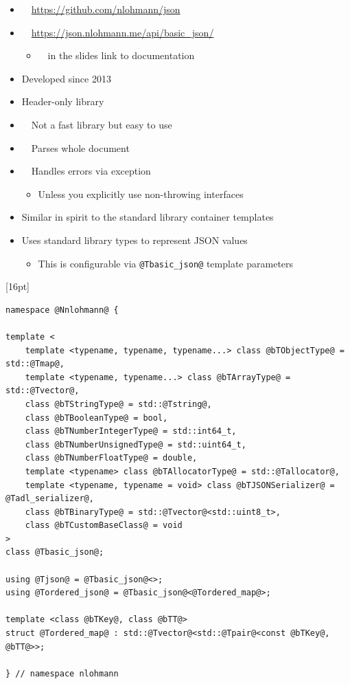 \documentclass{slides}
\makeatletter
\newcommand{\@slidetitle}{}
\newcommand{\slidetitle}[1]{\renewcommand{\@slidetitle}{#1}}
\makeatother
\begin{document}
\begin{itemize}[itemsep=0.5em]
  \item \faGithub\ \ \url{https://github.com/nlohmann/json}
  \item \faFileTextO\ \ \url{https://json.nlohmann.me/api/basic_json/}
  \begin{itemize}
    \item \faFileTextO\ \ in the slides link to documentation
  \end{itemize}
  \item Developed since 2013
  \item Header-only library
  \item {\color{orange}\faWarning}\ \ Not a fast library but easy to use
  \item {\color{orange}\faWarning}\ \ Parses whole document
  \item {\color{orange}\faWarning}\ \ Handles errors via exception
    \begin{itemize}
      \item Unless you explicitly use non-throwing interfaces
    \end{itemize}
  \item Similar in spirit to the standard library container templates
  \item Uses standard library types to represent JSON values
    \begin{itemize}
      \item This is configurable via \lstinline{@Tbasic_json@} template parameters
    \end{itemize}
\end{itemize}

\pagebreak
\slidetitle{\ttfamily nlohmann/json}

\begin{tcolorbox}
{\F{12pt}[16pt]
\begin{lstlisting}
namespace @Nnlohmann@ {

template <
    template <typename, typename, typename...> class @bTObjectType@ = std::@Tmap@,
    template <typename, typename...> class @bTArrayType@ = std::@Tvector@,
    class @bTStringType@ = std::@Tstring@,
    class @bTBooleanType@ = bool,
    class @bTNumberIntegerType@ = std::int64_t,
    class @bTNumberUnsignedType@ = std::uint64_t,
    class @bTNumberFloatType@ = double,
    template <typename> class @bTAllocatorType@ = std::@Tallocator@,
    template <typename, typename = void> class @bTJSONSerializer@ = @Tadl_serializer@,
    class @bTBinaryType@ = std::@Tvector@<std::uint8_t>,
    class @bTCustomBaseClass@ = void
>
class @Tbasic_json@;

using @Tjson@ = @Tbasic_json@<>;
using @Tordered_json@ = @Tbasic_json@<@Tordered_map@>;

template <class @bTKey@, class @bTT@>
struct @Tordered_map@ : std::@Tvector@<std::@Tpair@<const @bTKey@, @bTT@>>;

} // namespace nlohmann
\end{lstlisting}
}
\end{tcolorbox}
\end{document}

